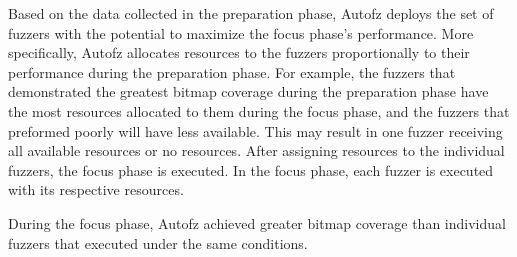 Based on the data collected in the preparation phase, Autofz deploys the set of fuzzers with the potential 
to maximize the focus phase’s performance. More specifically, Autofz allocates resources to the fuzzers 
proportionally to their performance during the preparation phase. For example, the fuzzers that demonstrated 
the greatest bitmap coverage during the preparation phase have the most resources allocated to them during 
the focus phase, and the fuzzers that preformed poorly will have less available. This may result in one 
fuzzer receiving all available resources or no resources. After assigning resources to the individual fuzzers, 
the focus phase is executed. In the focus phase, each fuzzer is executed with its respective resources.

During the focus phase, Autofz achieved greater bitmap coverage than individual fuzzers that executed under 
the same conditions. \cite{fu_autofz_2023}
